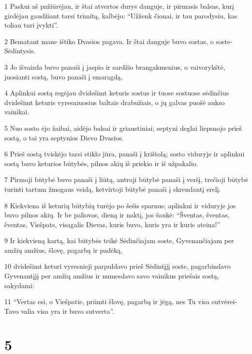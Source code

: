 \par 1 Paskui aš pažiūrėjau, ir štai atvertos durys danguje, ir pirmasis balsas, kurį girdėjau gaudžiant tarsi trimitą, kalbėjo: “Užženk čionai, ir tau parodysiu, kas toliau turi įvykti”. 
\par 2 Bematant mane ištiko Dvasios pagava. Ir štai danguje buvo sostas, o soste­Sėdintysis. 
\par 3 Jo išvaizda buvo panaši į jaspio ir sardžio brangakmenius, o vaivorykštė, juosianti sostą, buvo panaši į smaragdą. 
\par 4 Aplinkui sostą regėjau dvidešimt keturis sostus ir tuose sostuose sėdinčius dvidešimt keturis vyresniuosius baltais drabužiais, o jų galvas puošė aukso vainikai. 
\par 5 Nuo sosto ėjo žaibai, aidėjo balsai ir griaustiniai; septyni deglai liepsnojo prieš sostą, o tai yra septynios Dievo Dvasios. 
\par 6 Prieš sostą tviskėjo tarsi stiklo jūra, panaši į krištolą; sosto viduryje ir aplinkui sostą buvo keturios būtybės, pilnos akių iš priekio ir iš užpakalio. 
\par 7 Pirmoji būtybė buvo panaši į liūtą, antroji būtybė panaši į veršį, trečioji būtybė turinti tartum žmogaus veidą, ketvirtoji būtybė panaši į skrendantį erelį. 
\par 8 Kiekviena iš keturių būtybių turėjo po šešis sparnus; aplinkui ir viduryje jos buvo pilnos akių. Ir be paliovos, dieną ir naktį, jos šaukė: “Šventas, šventas, šventas, Viešpats, visagalis Dievas, kuris buvo, kuris yra ir kuris ateina!” 
\par 9 Ir kiekvieną kartą, kai būtybės teikė Sėdinčiajam soste, Gyvenančiajam per amžių amžius, šlovę, pagarbą ir padėką, 
\par 10 dvidešimt keturi vyresnieji parpuldavo prieš Sėdintįjį soste, pagarbindavo Gyvenantįjį per amžių amžius ir numesdavo savo vainikus priešais sostą, sakydami: 
\par 11 “Vertas esi, o Viešpatie, priimti šlovę, pagarbą ir jėgą, nes Tu visa sutvėrei­Tavo valia visa yra ir buvo sutverta”.


\chapter{5}


